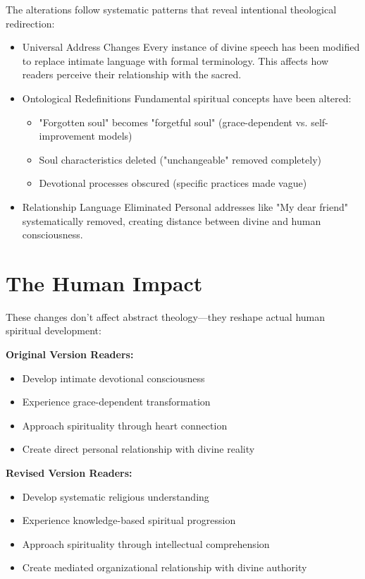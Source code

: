 \documentclass[11pt,twoside]{book}
\begin{document}
The alterations follow systematic patterns that reveal intentional theological redirection:
\begin{itemize}
\item Universal Address Changes
\label{sec:orga38ae8a}
Every instance of divine speech has been modified to replace intimate language with formal terminology. This affects how readers perceive their relationship with the sacred.
\item Ontological Redefinitions
\label{sec:orgda64121}
Fundamental spiritual concepts have been altered:
\begin{itemize}
\item "Forgotten soul" becomes "forgetful soul" (grace-dependent vs. self-improvement models)
\item Soul characteristics deleted ("unchangeable" removed completely)
\item Devotional processes obscured (specific practices made vague)
\end{itemize}
\item Relationship Language Eliminated
\label{sec:orgdcd5a36}
Personal addresses like "My dear friend" systematically removed, creating distance between divine and human consciousness.

\sectionbreak
\end{itemize}
\section*{The Human Impact}
\label{sec:orgd380189}

These changes don't affect abstract theology—they reshape actual human spiritual development:

\textbf{\textbf{Original Version Readers:}}
\begin{itemize}
\item Develop intimate devotional consciousness
\item Experience grace-dependent transformation
\item Approach spirituality through heart connection
\item Create direct personal relationship with divine reality
\end{itemize}

\textbf{\textbf{Revised Version Readers:}}
\begin{itemize}
\item Develop systematic religious understanding
\item Experience knowledge-based spiritual progression
\item Approach spirituality through intellectual comprehension
\item Create mediated organizational relationship with divine authority
\end{itemize}
\end{document}
